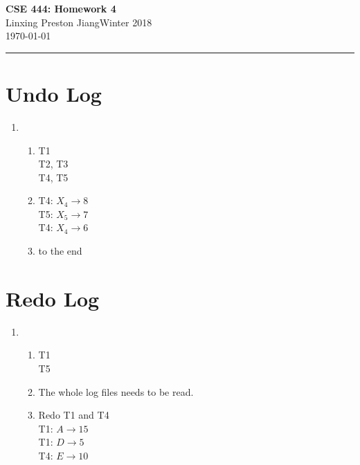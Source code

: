 \documentclass[10pt]{myland}
\renewcommand{\myname}{Linxing Preston Jiang}
\renewcommand{\quarter}{Winter 2018}
\renewcommand{\myhwname}{\textbf{CSE 444: Homework 4}}
\begin{document}
\begin{center}
	{\Large \myhwname} \\
	\vspace{.05in}
    \myname\quad\quarter\\
	\vspace{.05in}
    \today \\
\end{center}
\vspace{.15in} \hrule \vspace{0.5em}%

\section{Undo Log}
\begin{enumerate}
    \item
    \begin{enumerate}
        \item
         T1\\
         T2, T3\\
         T4, T5\\
        \item
            T4: $X_4 \to 8$ \\
            T5: $X_5 \to 7$ \\
            T4: $X_4 \to 6$ \\
        \item <START T4> to the end
    \end{enumerate}
\end{enumerate}

\section{Redo Log}
\begin{enumerate}
    \item
    \begin{enumerate}
        \item
         T1\\
         T5\\
        \item The whole log files needs to be read.
        \item Redo T1 and T4 \\
            T1: $A \to 15$ \\
            T1: $D \to 5$ \\
            T4: $E \to 10$ \\
    \end{enumerate}
\end{enumerate}
\end{document}
